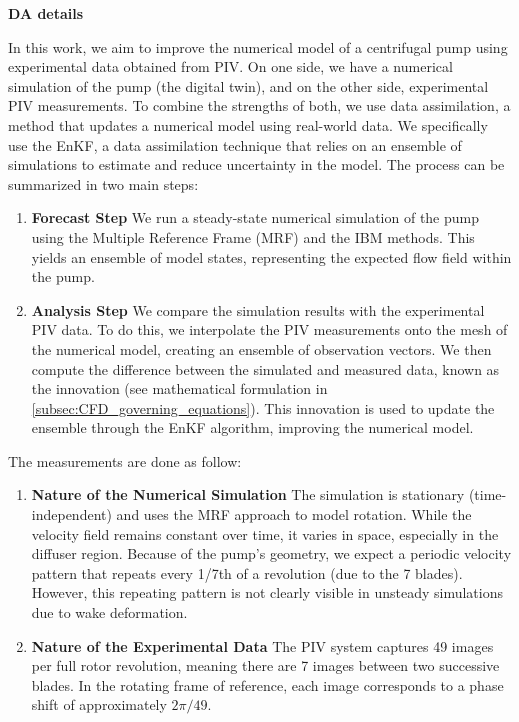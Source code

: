 \textbf{DA details}

In this work, we aim to improve the numerical model of a centrifugal pump using experimental data obtained from PIV. On one side, we have a numerical simulation of the pump (the digital twin), and on the other side, experimental PIV measurements. To combine the strengths of both, we use data assimilation, a method that updates a numerical model using real-world data.
We specifically use the EnKF, a data assimilation technique that relies on an ensemble of simulations to estimate and reduce uncertainty in the model. The process can be summarized in two main steps:

\begin{enumerate}
    \item \textbf{Forecast Step} We run a steady-state numerical simulation of the pump using the Multiple Reference Frame (MRF) and the IBM methods. This yields an ensemble of model states, representing the expected flow field within the pump.
    \item \textbf{Analysis Step} We compare the simulation results with the experimental PIV data. To do this, we interpolate the PIV measurements onto the mesh of the numerical model, creating an ensemble of observation vectors. We then compute the difference between the simulated and measured data, known as the innovation (see mathematical formulation in \autoref{subsec:CFD_governing_equations}). This innovation is used to update the ensemble through the EnKF algorithm, improving the numerical model.
\end{enumerate}


The measurements are done as follow:

\begin{enumerate}
    \item \textbf{Nature of the Numerical Simulation} The simulation is stationary (time-independent) and uses the MRF approach to model rotation. While the velocity field remains constant over time, it varies in space, especially in the diffuser region. Because of the pump's geometry, we expect a periodic velocity pattern that repeats every 1/7th of a revolution (due to the 7 blades). However, this repeating pattern is not clearly visible in unsteady simulations due to wake deformation.
    \item \textbf{Nature of the Experimental Data} The PIV system captures 49 images per full rotor revolution, meaning there are 7 images between two successive blades. In the rotating frame of reference, each image corresponds to a phase shift of approximately $2\pi/49$.
\end{enumerate}



